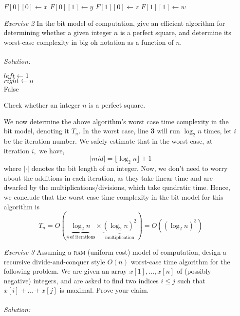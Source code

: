 \documentclass[12pt]{article}
\theoremstyle{definition}
\theoremstyle{remark}
\newcommand\sol{%
  \\ 
  \\
  \textit{Solution:}\\%
}
\begin{document}
\begin{enumerate}
\begin{algorithm}
{    $F[0][0] \leftarrow x$\;
    $F[0][1] \leftarrow y$\;
    $F[1][0] \leftarrow z$\;
    $F[1][1] \leftarrow w$\;
}
\BlankLine

\end{algorithm}

\newpage
\item[\it Exercise 2] In the bit model of computation, give an efficient algorithm for determining whether a given integer $n$ is a perfect square, and determine its worst-case complexity in big oh notation as a function of $n$.
\sol  
\IncMargin{1em}
\begin{algorithm}

\BlankLine
$left \leftarrow 1$ \\ 
$right \leftarrow n$ \\ 
  \Return False

\caption{Check whether an integer $n$ is a perfect square. }\label{algo_disjdecomp}
\end{algorithm}\DecMargin{1em}


We now determine the above algorithm's worst case time complexity in the bit model, denoting it $T_n$. In the worst case, line \textbf{3} will run $\log_2 n$ times, let $i$ be the iteration number. We safely estimate that in the worst case, at iteration $i,$ we have, $$|mid|= \lfloor \log_2 n \rfloor + 1$$ 
where $|\cdot |$ denotes the bit length of an integer. Now, we don't need to worry about the additions in each iteration, as they take linear time and are dwarfed by the multiplications/divisions, which take quadratic time. Hence, we conclude that the worst case time complexity in the bit model for this algorithm is 
$$T_n = O(\underbrace{\log_2 n}_{\text{\# of iterations}} \times \underbrace{(\log_2 n)^2}_{\text{multiplication}}) = O((\log_2 n )^3) $$
\newpage 
\item[\it Exercise 3] Assuming a \textsc{ram} (uniform cost) model of computation, design a recursive divide-and-conquer style $O(n)$ worst-case time algorithm for the following problem. We are given an array $x[1],... , x[n]$ of (possibly negative) integers, and are asked to find two indices $i \leq j$ such that $ x[i] +...+ x[j]$ is maximal. Prove your claim.
\sol 
\IncMargin{1em}
\begin{algorithm}


\end{algorithm}
\end{enumerate}
\end{document}
